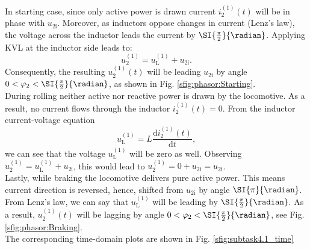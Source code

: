 
\begin{solutionblock}
In starting case, since only active power is drawn current $i^\mathrm{(1)}_\mathrm{2}(t)$ will be in phase with $u_\mathrm{2i}$. Moreover, as inductors oppose changes in current (Lenz's law), the voltage across the inductor leads the current by $\SI{\frac{\pi}{2}}{\radian}$. Applying KVL at the inductor side leads to:
$$ u^\mathrm{(1)}_\mathrm{2} = u^\mathrm{(1)}_\mathrm{L} +  u_\mathrm{2i}.$$
Consequently, the resulting $u^\mathrm{(1)}_\mathrm{2}(t)$ will be leading $u_\mathrm{2i}$ by angle $0 < \varphi_2 < \SI{\frac{\pi}{2}}{\radian}$, as shown in Fig. \ref{sfig:phasor:Starting}.\\

During rolling neither active nor reactive power is drawn by the locomotive. As a result, no current flows through the inductor $i^\mathrm{(1)}_\mathrm{2}(t) = 0$. From the inductor current-voltage equation
$$ u^\mathrm{(1)}_\mathrm{L} = L \frac{\mathrm{d}i^\mathrm{(1)}_\mathrm{2}(t)}{\mathrm{d}t},$$
we can see that the voltage $u^\mathrm{(1)}_\mathrm{L}$ will be zero as well. Observing $u^\mathrm{(1)}_\mathrm{2} = u^\mathrm{(1)}_\mathrm{L} +  u_\mathrm{2i}$, this would lead to $u^\mathrm{(1)}_\mathrm{2} = 0 +  u_\mathrm{2i} = u_\mathrm{2i}$.\\

Lastly, while braking the locomotive delivers pure active power. This means current direction is reversed, hence, shifted from $u_\mathrm{2i}$ by angle $\SI{\pi}{\radian}$. From Lenz's law, we can say that $u^\mathrm{(1)}_\mathrm{L}$ will be leading by $\SI{\frac{\pi}{2}}{\radian}$. As a result, $u^\mathrm{(1)}_\mathrm{2}(t)$ will be lagging by angle $0 < \varphi_2 < \SI{\frac{\pi}{2}}{\radian}$, see Fig. \ref{sfig:phasor:Braking}.\\

The corresponding time-domain plots are shown in Fig. \ref{sfig:subtask4.1_time}

\end{solutionblock}



